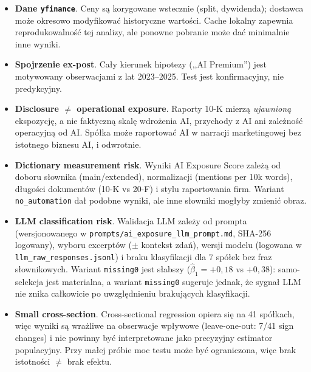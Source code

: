 \documentclass[11pt,a4paper]{article}
\begin{document}
\begin{itemize}
        częściowym. Nie zmienia to głównej logiki testu, ale w wersji produkcyjnej
        warto dodać wariant z wykluczeniem niepełnego miesiąca.
  \item \textbf{Dane \texttt{yfinance}}. Ceny są korygowane wstecznie (split,
        dywidenda); dostawca może okresowo modyfikować historyczne wartości.
        Cache lokalny zapewnia reprodukowalność tej analizy, ale ponowne
        pobranie może dać minimalnie inne wyniki.
  \item \textbf{Spojrzenie ex-post}. Cały kierunek hipotezy (,,AI Premium'')
        jest motywowany obserwacjami z lat 2023--2025. Test jest
        konfirmacyjny, nie predykcyjny.
  \item \textbf{Disclosure $\neq$ operational exposure}. Raporty 10-K mierzą
        \emph{ujawnioną} ekspozycję, a nie faktyczną skalę wdrożenia AI,
        przychody z AI ani zależność operacyjną od AI. Spółka może raportować
        AI w narracji marketingowej bez istotnego biznesu AI, i odwrotnie.
  \item \textbf{Dictionary measurement risk}. Wyniki AI Exposure Score zależą
        od doboru słownika (main/extended), normalizacji (mentions per 10k
        words), długości dokumentów (10-K vs 20-F) i stylu raportowania firm.
        Wariant \texttt{no\_automation} dał podobne wyniki, ale inne słowniki
        mogłyby zmienić obraz.
  \item \textbf{LLM classification risk}. Walidacja LLM zależy od prompta
        (wersjonowanego w \texttt{prompts/ai\_exposure\_llm\_prompt.md},
        SHA-256 logowany), wyboru excerptów ($\pm$ kontekst zdań), wersji
        modelu (logowana w \texttt{llm\_raw\_responses.jsonl}) i braku
        klasyfikacji dla 7 spółek bez fraz słownikowych. Wariant
        \texttt{missing0} jest słabszy ($\hat\beta_1 = +0{,}18$ vs $+0{,}38$):
        samo-selekcja jest materialna, a wariant \texttt{missing0} sugeruje
        jednak, że sygnał LLM nie znika całkowicie po uwzględnieniu brakujących
        klasyfikacji.
  \item \textbf{Small cross-section}. Cross-sectional regression opiera się
        na 41 spółkach, więc wyniki są wrażliwe na obserwacje wpływowe
        (leave-one-out: 7/41 sign changes) i nie powinny być interpretowane
        jako precyzyjny estimator populacyjny. Przy małej próbie moc testu
        może być ograniczona, więc brak istotności $\neq$ brak efektu.
\end{itemize}

\end{document}

